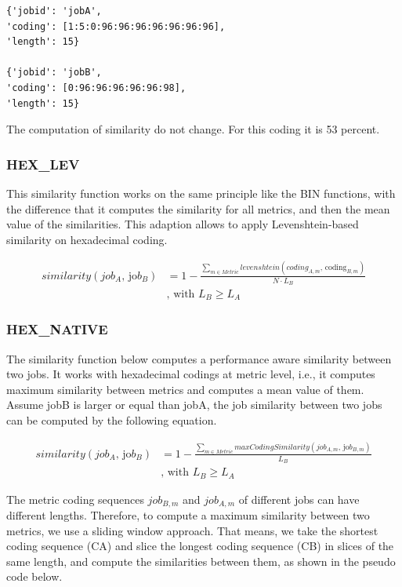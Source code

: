 \documentclass[]{llncs}
\begin{document}
\begin{lstlisting}
{'jobid': 'jobA',
'coding': [1:5:0:96:96:96:96:96:96:96],
'length': 15}

{'jobid': 'jobB',
'coding': [0:96:96:96:96:96:98],
'length': 15}
\end{lstlisting}

The computation of similarity do not change.
For this coding it is 53 percent.


\subsubsection{HEX\_LEV}
This similarity function works on the same principle like the BIN functions, with the difference that it computes the similarity for all metrics, and then the mean value of the similarities.
This adaption allows to apply Levenshtein-based similarity on hexadecimal coding.

\begin{align}
  similarity \left( job_{A}\text{, jo}b_{B} \right) &= 1 -\frac{ \sum_{m \in Metric}^{} levenshtein \left( coding_{A,m}\text{, coding}_{B,m} \right) }{N \cdot L_{B}} \\
	&\text{, with }L_{B} \geq L_{A}
\end{align}

\subsubsection{HEX\_NATIVE}
The similarity function below computes a performance aware similarity between two jobs.
It works with hexadecimal codings at metric level, i.e., it computes maximum similarity between metrics and computes a mean value of them.
Assume jobB is larger or equal than jobA, the job similarity between two jobs can be computed by the following equation.

\begin{align}
similarity \left( job_{A}\text{, jo}b_{B} \right) &= 1-\frac{ \sum _{m \in Metric}^{}maxCodingSimilarity \left( job_{A,m}\text{, jo}b_{B,m} \right) }{L_{B}}\\
&\text{, with }L_{B} \geq L_{A}
\end{align}

The metric coding sequences $job_{B,m}$ and $job_{A,m}$ of different jobs can have different lengths.
Therefore, to compute a maximum similarity between two metrics, we use a sliding window approach.
That means, we take the shortest coding sequence (CA) and slice the longest coding sequence (CB) in slices of the same length, and compute the similarities between them, as shown in the pseudo code below.
\end{document}

